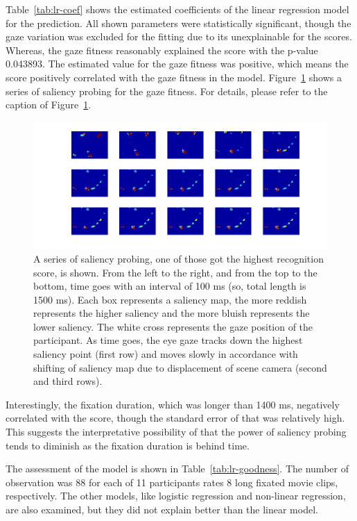 \documentclass[oneside,master]{snueethesis}
\begin{document}
Table~\ref{tab:lr-coef} shows the estimated coefficients of the linear regression model for the prediction. All shown parameters were statistically significant, though the gaze variation was excluded for the fitting due to its unexplainable for the scores. Whereas, the gaze fitness reasonably explained the score with the p-value 0.043893. The estimated value for the gaze fitness was positive, which means the score positively correlated with the gaze fitness in the model. Figure~\ref{fig:probing} shows a series of saliency probing for the gaze fitness. For details, please refer to the caption of Figure~\ref{fig:probing}.

\begin{figure}
  \centerline{\includegraphics[width=150mm]{./eps/probing.png}}
  \caption[A series of saliency probing]{A series of saliency probing, one of those got the highest recognition score, is shown. From the left to the right, and from the top to the bottom, time goes with an interval of 100 ms (so, total length is 1500 ms). Each box represents a saliency map, the more reddish represents the higher saliency and the more bluish represents the lower saliency. The white cross represents the gaze position of the participant. As time goes, the eye gaze tracks down the highest saliency point (first row) and moves slowly in accordance with shifting of saliency map due to displacement of scene camera (second and third rows).}
  \label{fig:probing}
\end{figure}

Interestingly, the fixation duration, which was longer than 1400 ms, negatively correlated with the score, though the standard error of that was relatively high. This suggests the interpretative possibility of that the power of saliency probing tends to diminish as the fixation duration is behind time.

The assessment of the model is shown in Table~\ref{tab:lr-goodness}. The number of observation was 88 for each of 11 participants rates 8 long fixated movie clips, respectively. The other models, like logistic regression and non-linear regression, are also examined, but they did not explain better than the linear model.
\end{document}
